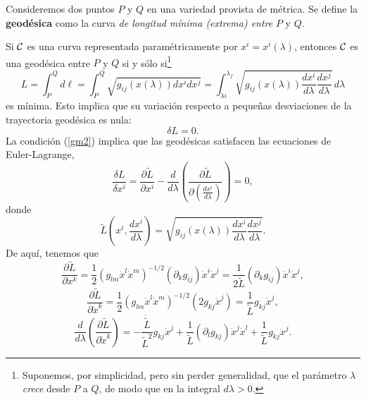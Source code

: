 Consideremos dos puntos $P$ y $Q$ en una variedad provista de métrica.
Se define la \textbf{geodésica} como la curva \textit{de longitud mínima  (extrema) entre} $P$ y $Q$.

Si $\cal C$ es una curva representada paramétricamente por
$x^i =x^i (\lambda)$, entonces $\cal C$ es una geodésica entre $P$ y $Q$ si y
sólo si\footnote{Suponemos, por simplicidad, pero sin perder generalidad, que el parámetro $\lambda$ \textit{crece} desde $P$ a $Q$, de modo que en la integral $d\lambda>0$.}
\begin{equation}
L=\int_P^Qd\ell= \int_P^Q\sqrt{g_{ij}(x(\lambda))dx^idx^j}=\int_{\lambda i}^{\lambda_{f}}\sqrt{g_{ij}(x(\lambda))\frac{dx^i}{d\lambda}\frac{dx^j}{d\lambda}}\, d\lambda \label{gm1}
\end{equation}
es mínima. Esto implica que su variación respecto a pequeñas desviaciones de la trayectoria geodésica es nula:
\begin{equation}
\delta L=0. \label{gm2}
\end{equation}
La condición (\ref{gm2}) implica que las geodésicas satisfacen las ecuaciones de Euler-Lagrange,
\begin{equation}
\frac{\delta L}{\delta x^i}=\frac{\partial \tilde{L}}{\partial x^i}-\frac
{d}{d\lambda}\left( \frac{\partial
\tilde{L}}{\partial\left(\frac{dx^i}{d\lambda}\right)}\right) =0,
\label{gm3}
\end{equation}
donde
\begin{equation}
\tilde{L}(x^i,\frac{dx^i}{d\lambda})=\sqrt{g_{ij}(x(\lambda))\frac{dx^i
}{d\lambda}\frac{dx^j}{d\lambda}}.
\label{gm4}
\end{equation}
De aquí, tenemos que
\begin{equation}
\frac{\partial\tilde{L}}{\partial x^k}=\frac{1}{2}(g_{lm}\dot{x}^l\dot{x}^m)^{-1/2}(\partial_k g_{ij})\dot{x}^i\dot{x}^j=\frac{1}{2\tilde{L}}(\partial_k g_{ij})\dot{x}^i\dot{x}^j,
\end{equation}
\begin{equation}
\frac{\partial\tilde{L}}{\partial \dot{x}^k}=\frac{1}{2}(g_{lm}\dot{x}^l\dot{x}^m)^{-1/2}(2g_{kj}\dot{x}^j)=\frac{1}{\tilde{L}}g_{kj}\dot{x}^j,
\end{equation}
\begin{equation}
\frac{d}{d\lambda}\left(\frac{\partial\tilde{L}}{\partial \dot{x}^k}\right)= -\frac{\dot{\tilde{L}}}{\tilde{L}^2}g_{kj}\dot{x}^j+\frac{1}{\tilde{L}}(\partial_l g_{kj})\dot{x}^j\dot{x}^l+\frac{1}{\tilde{L}}g_{kj}\ddot{x}^j.
\end{equation}
